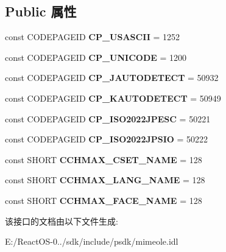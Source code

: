 \subsection*{Public 属性}
\begin{DoxyCompactItemize}
\item 
\mbox{\label{interface_m_i_m_e_o_l_e_1_1_i_mime_international_a21db59c73b862139e6b4aff2b4b21e88}} 
const C\+O\+D\+E\+P\+A\+G\+E\+ID {\bfseries C\+P\+\_\+\+U\+S\+A\+S\+C\+II} = 1252
\item 
\mbox{\label{interface_m_i_m_e_o_l_e_1_1_i_mime_international_a6035ea70bfeba2dfbd1e5957dc479b7e}} 
const C\+O\+D\+E\+P\+A\+G\+E\+ID {\bfseries C\+P\+\_\+\+U\+N\+I\+C\+O\+DE} = 1200
\item 
\mbox{\label{interface_m_i_m_e_o_l_e_1_1_i_mime_international_a8dd444f74705958b8eda9e601511e36c}} 
const C\+O\+D\+E\+P\+A\+G\+E\+ID {\bfseries C\+P\+\_\+\+J\+A\+U\+T\+O\+D\+E\+T\+E\+CT} = 50932
\item 
\mbox{\label{interface_m_i_m_e_o_l_e_1_1_i_mime_international_a29543933c2248a2826b71720d888b7cd}} 
const C\+O\+D\+E\+P\+A\+G\+E\+ID {\bfseries C\+P\+\_\+\+K\+A\+U\+T\+O\+D\+E\+T\+E\+CT} = 50949
\item 
\mbox{\label{interface_m_i_m_e_o_l_e_1_1_i_mime_international_aaeacf26a1d583454ee64e7095f16c2d2}} 
const C\+O\+D\+E\+P\+A\+G\+E\+ID {\bfseries C\+P\+\_\+\+I\+S\+O2022\+J\+P\+E\+SC} = 50221
\item 
\mbox{\label{interface_m_i_m_e_o_l_e_1_1_i_mime_international_a6e19342d76409da06bd8c32beac37ac2}} 
const C\+O\+D\+E\+P\+A\+G\+E\+ID {\bfseries C\+P\+\_\+\+I\+S\+O2022\+J\+P\+S\+IO} = 50222
\item 
\mbox{\label{interface_m_i_m_e_o_l_e_1_1_i_mime_international_aee88c6c03c564ff084cdf57d12123e72}} 
const S\+H\+O\+RT {\bfseries C\+C\+H\+M\+A\+X\+\_\+\+C\+S\+E\+T\+\_\+\+N\+A\+ME} = 128
\item 
\mbox{\label{interface_m_i_m_e_o_l_e_1_1_i_mime_international_a72d13ac3639e6c9a448aefc796fa7c14}} 
const S\+H\+O\+RT {\bfseries C\+C\+H\+M\+A\+X\+\_\+\+L\+A\+N\+G\+\_\+\+N\+A\+ME} = 128
\item 
\mbox{\label{interface_m_i_m_e_o_l_e_1_1_i_mime_international_a7e1e0917748612918fd97c53f381beb2}} 
const S\+H\+O\+RT {\bfseries C\+C\+H\+M\+A\+X\+\_\+\+F\+A\+C\+E\+\_\+\+N\+A\+ME} = 128
\end{DoxyCompactItemize}


该接口的文档由以下文件生成\+:\begin{DoxyCompactItemize}
\item 
E\+:/\+React\+O\+S-\/0../sdk/include/psdk/mimeole.\+idl\end{DoxyCompactItemize}
